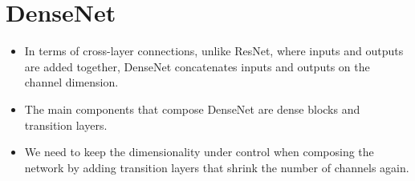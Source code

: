 \documentclass[12pt,notitlepage]{article}
\begin{document}
\section{DenseNet}
\begin{itemize}
  \item In terms of cross-layer connections, unlike ResNet, where inputs and outputs are added together, DenseNet concatenates inputs and outputs on the channel dimension.
  \item The main components that compose DenseNet are dense blocks and transition layers.
  \item We need to keep the dimensionality under control when composing the network by adding transition layers that shrink the number of channels again.
\end{itemize}

\vfill

\nocite{zhang2020dive}
\end{document}
